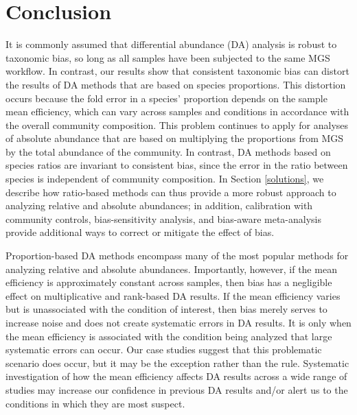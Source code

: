 \documentclass[
]{article}
\begin{document}
\hypertarget{conclusion}{%
\section{Conclusion}\label{conclusion}}

It is commonly assumed that differential abundance (DA) analysis is robust to taxonomic bias, so long as all samples have been subjected to the same MGS workflow.
In contrast, our results show that consistent taxonomic bias can distort the results of DA methods that are based on species proportions.
This distortion occurs because the fold error in a species' proportion depends on the sample mean efficiency, which can vary across samples and conditions in accordance with the overall community composition.
This problem continues to apply for analyses of absolute abundance that are based on multiplying the proportions from MGS by the total abundance of the community.
In contrast, DA methods based on species ratios are invariant to consistent bias, since the error in the ratio between species is independent of community composition.
In Section \ref{solutions}, we describe how ratio-based methods can thus provide a more robust approach to analyzing relative and absolute abundances;
in addition, calibration with community controls, bias-sensitivity analysis, and bias-aware meta-analysis provide additional ways to correct or mitigate the effect of bias.

Proportion-based DA methods encompass many of the most popular methods for analyzing relative and absolute abundances.
Importantly, however, if the mean efficiency is approximately constant across samples, then bias has a negligible effect on multiplicative and rank-based DA results.
If the mean efficiency varies but is unassociated with the condition of interest, then bias merely serves to increase noise and does not create systematic errors in DA results.
It is only when the mean efficiency is associated with the condition being analyzed that large systematic errors can occur.
Our case studies suggest that this problematic scenario does occur, but it may be the exception rather than the rule.
Systematic investigation of how the mean efficiency affects DA results across a wide range of studies may increase our confidence in previous DA results and/or alert us to the conditions in which they are most suspect.
\end{document}
